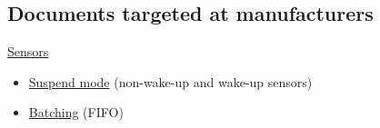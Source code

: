 \documentclass{article}
\begin{document}
\subsection{Documents targeted at manufacturers}

\href{https://source.android.com/devices/sensors/index.html}{Sensors}
\begin{itemize}
\item \href{https://source.android.com/devices/sensors/suspend-mode.html}
  {Suspend mode} (non-wake-up and wake-up sensors)
  
\item \href{https://source.android.com/devices/sensors/batching.html}
  {Batching} (FIFO)
\end{itemize}
\end{document}
